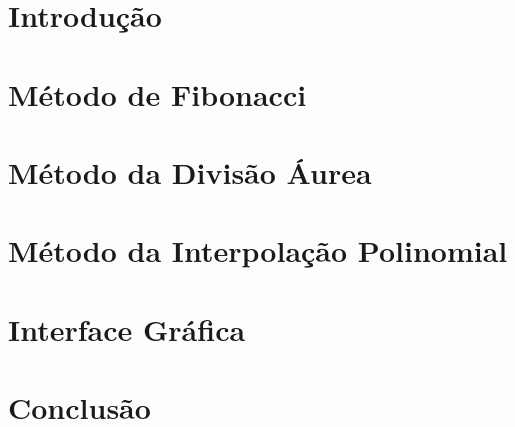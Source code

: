 \documentclass{article}
\begin{document}
\large


\tableofcontents

\newpage

\section{Introdução}



\section{Método de Fibonacci}\label{sec:fibo}



\section{Método da Divisão Áurea}\label{sec:aurea}



\section{Método da Interpolação Polinomial}\label{sec:interpol}



\section{Interface Gráfica}\label{sec:gui}



\section{Conclusão}


	
\end{document}
